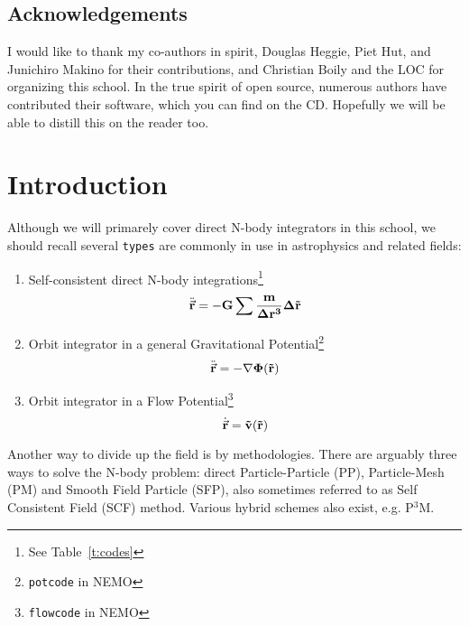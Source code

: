 \section*{Acknowledgements}

I would like to thank my co-authors in spirit, 
Douglas Heggie, Piet Hut, and Junichiro Makino for their contributions, and
Christian Boily and the LOC for organizing this school.
In the true spirit of open source, 
numerous authors have contributed their software, which you can find on
the CD. Hopefully we will be able to distill this on the reader too.


\chapter                {Introduction}

Although we will primarely cover direct N-body integrators in this school,
we should recall several {\tt types} are commonly in use
in astrophysics and related fields:

\begin{enumerate}
\item
Self-consistent direct N-body integrations\footnote{See Table~\ref{t:codes}}
\begin{equation}
    \ddot{\vec{\bf r}} = -G \sum{ {m\over{\Delta r^3}} \Delta \vec{\bf r}}
\end{equation}

\item
Orbit integrator in a general Gravitational Potential\footnote{{\tt potcode} in NEMO}
\begin{equation}
    \ddot{\vec{\bf r}} = -\nabla \Phi(\vec{\bf r})
\end{equation}

\item
Orbit integrator in a Flow Potential\footnote{{\tt flowcode} in NEMO}
\begin{equation}
    \dot{\vec{\bf r}} = \vec{\bf v}(\vec{\bf r})
\end{equation}


\end{enumerate}

Another way to divide up the field is by methodologies. There are arguably
three ways to solve the N-body problem: direct Particle-Particle (PP),
Particle-Mesh (PM) and Smooth Field Particle (SFP), also sometimes 
referred to as Self Consistent Field (SCF) method. Various hybrid schemes
also exist, e.g. P$^3$M.

